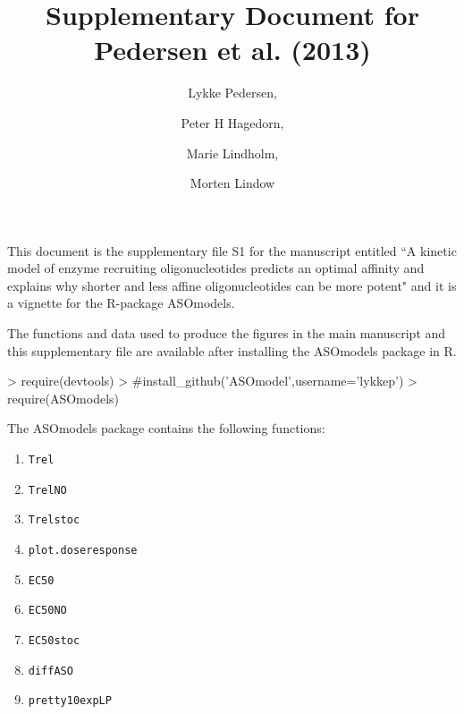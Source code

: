 \documentclass[a4paper,11pt]{article}
\title{Supplementary Document for Pedersen et al. (2013)}
\author{Lykke Pedersen, \and Peter H Hagedorn, \and Marie Lindholm, \and Morten Lindow}
\date{}
\begin{document}

\maketitle

This document is the supplementary file S1 for the manuscript entitled ``A kinetic model of enzyme recruiting oligonucleotides predicts an optimal affinity and explains why shorter and less affine oligonucleotides can be more potent" and it is a vignette for the R-package ASOmodels.

The functions and data used to produce the figures in the main manuscript and this supplementary file are available after installing the ASOmodels package in R.
\begin{Schunk}
\begin{Sinput}
> require(devtools)
> #install_github('ASOmodel',username='lykkep')
> require(ASOmodels)
\end{Sinput}
\end{Schunk}
The ASOmodels package contains the following functions:
\begin{enumerate}
\item \texttt{Trel}
\item \texttt{TrelNO}
\item \texttt{Trelstoc}
\item \texttt{plot.doseresponse}
\item \texttt{EC50}
\item \texttt{EC50NO}
\item \texttt{EC50stoc}
\item \texttt{diffASO}
\item \texttt{pretty10expLP}
\end{enumerate}

\newpage

\tableofcontents

\newpage


\end{document}

